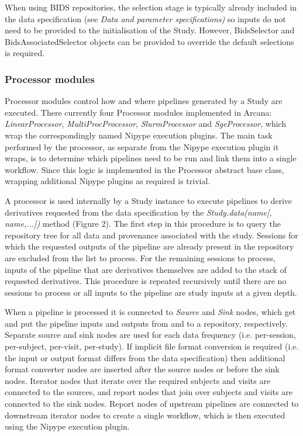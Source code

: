 When using BIDS repositories, the selection stage is typically already
included in the data specification (see \emph{Data and parameter
specifications)} so inputs do not need to be provided to the
initialisation of the Study. However, BidsSelector and
BidsAssociatedSelector objects can be provided to override the default
selections is required.

\hypertarget{processor-modules}{%
\subsubsection{Processor modules}\label{processor-modules}}

Processor modules control how and where pipelines generated by a Study
are executed. There currently four Processor modules implemented in
Arcana: \emph{LinearProcessor}, \emph{MultiProcProcessor},
\emph{SlurmProcessor} and \emph{SgeProcessor}, which wrap the
correspondingly named Nipype execution plugins. The main task performed
by the processor, as separate from the Nipype execution plugin it wraps,
is to determine which pipelines need to be run and link them into a
single workflow. Since this logic is implemented in the Processor
abstract base class, wrapping additional Nipype plugins as required is
trivial.

A processor is used internally by a Study instance to execute pipelines
to derive derivatives requested from the data specification by the
\emph{Study.data(name{[}, name,...{]})} method (Figure 2). The first
step in this procedure is to query the repository tree for all data and
provenance associated with the study. Sessions for which the requested
outputs of the pipeline are already present in the repository are
excluded from the list to process. For the remaining sessions to
process, inputs of the pipeline that are derivatives themselves are
added to the stack of requested derivatives. This procedure is repeated
recursively until there are no sessions to process or all inputs to the
pipeline are study inputs at a given depth.

When a pipeline is processed it is connected to \emph{Source} and
\emph{Sink} nodes, which get and put the pipeline inputs and outputs
from and to a repository, respectively. Separate source and sink nodes
are used for each data frequency (i.e. per-session, per-subject,
per-visit, per-study). If implicit file format conversion is required
(i.e. the input or output format differs from the data specification)
then additional format converter nodes are inserted after the source
nodes or before the sink nodes. Iterator nodes that iterate over the
required subjects and visits are connected to the sources, and report
nodes that join over subjects and visits are connected to the sink
nodes. Report nodes of upstream pipelines are connected to downstream
iterator nodes to create a single workflow, which is then executed using
the Nipype execution plugin.

